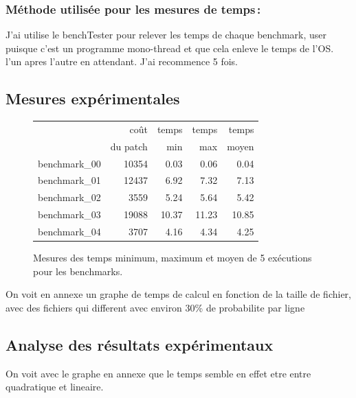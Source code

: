 \documentclass[a4paper,10pt,french]{article}
\begin{document}
    \subsubsection{Méthode utilisée pour les mesures de temps\,: }
	J'ai utilise le benchTester pour relever les temps de chaque benchmark, user puisque c'est un programme mono-thread et que cela enleve le temps de l'OS. l'un apres l'autre en attendant. J'ai recommence 5 fois.

  \subsection{Mesures expérimentales}

    \begin{figure}[h]
      \begin{center}
        \begin{tabular}{|l||r||r|r|r||}
          \hline
          \hline
            & coût         & temps     & temps   & temps \\
            & du patch     & min       & max     & moyen \\
          \hline
          \hline
		  benchmark\_00 &   10354   &  0.03 &  0.06   &  0.04   \\
          \hline
		  benchmark\_01 &   12437   &  6.92 &  7.32   &  7.13   \\
          \hline
		  benchmark\_02 &   3559    &  5.24 &  5.64   &  5.42   \\
          \hline
		  benchmark\_03 &   19088   & 10.37 & 11.23   &  10.85  \\
          \hline
		  benchmark\_04 &   3707    &  4.16 &  4.34   &  4.25   \\
          \hline
          \hline
        \end{tabular}
        \caption{Mesures des temps minimum, maximum et moyen de 5 exécutions pour les benchmarks.}
        \label{table-temps}
      \end{center}
    \end{figure}

	On voit en annexe un graphe de temps de calcul en fonction de la taille de fichier, avec des fichiers qui different avec environ 30\% de probabilite par ligne

\subsection{Analyse des résultats expérimentaux}
On voit avec le graphe en annexe que le temps semble en effet etre entre quadratique et lineaire.
\end{document}
